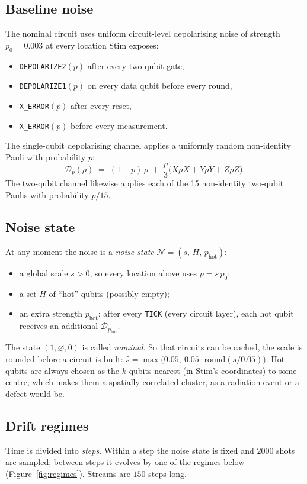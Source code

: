 \documentclass[11pt,a4paper]{article}
\newcommand{\code}[1]{\texttt{#1}}
\begin{document}
\subsection{Baseline noise}
The nominal circuit uses uniform circuit-level depolarising noise of strength $p_0 = 0.003$ at every
location Stim exposes:
\begin{itemize}
  \item \code{DEPOLARIZE2}$(p)$ after every two-qubit gate,
  \item \code{DEPOLARIZE1}$(p)$ on every data qubit before every round,
  \item \code{X\_ERROR}$(p)$ after every reset,
  \item \code{X\_ERROR}$(p)$ before every measurement.
\end{itemize}
The single-qubit depolarising channel applies a uniformly random non-identity Pauli with probability $p$:
\begin{equation}
  \mathcal{D}_p(\rho) \;=\; (1-p)\,\rho \;+\; \frac{p}{3}\bigl(X\rho X + Y\rho Y + Z\rho Z\bigr).
\end{equation}
The two-qubit channel likewise applies each of the 15 non-identity two-qubit Paulis with probability $p/15$.

\subsection{Noise state}
At any moment the noise is a \emph{noise state} $\mathcal{N} = (s,\, H,\, p_{\mathrm{hot}})$:
\begin{itemize}
  \item a global scale $s>0$, so every location above uses $p = s\,p_0$;
  \item a set $H$ of ``hot'' qubits (possibly empty);
  \item an extra strength $p_{\mathrm{hot}}$: after every \code{TICK} (every circuit layer), each hot qubit
        receives an additional $\mathcal{D}_{p_{\mathrm{hot}}}$.
\end{itemize}
The state $(1,\varnothing,0)$ is called \emph{nominal}. So that circuits can be cached, the scale is
rounded before a circuit is built: $\hat s = \max\bigl(0.05,\ 0.05\cdot\mathrm{round}(s/0.05)\bigr)$.
Hot qubits are always chosen as the $k$ qubits nearest (in Stim's coordinates) to some centre,
which makes them a spatially correlated cluster, as a radiation event or a defect would be.

\subsection{Drift regimes}
Time is divided into \emph{steps}. Within a step the noise state is fixed and $2000$ shots are sampled;
between steps it evolves by one of the regimes below (Figure~\ref{fig:regimes}). Streams are $150$ steps long.
\end{document}
